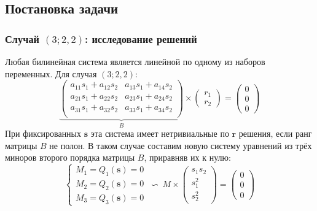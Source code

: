 \documentclass[russian,hyperref={unicode}]{beamer}
\begin{document}
\subsection{Постановка задачи}
\frame
{
	\frametitle{Случай $(3; 2, 2)$: исследование решений}
	Любая билинейная система является линейной по одному из наборов переменных. Для 
	случая $(3;2, 2)$:
	$$
		\underbrace{
		\begin{pmatrix}
			a_{1 1} s_1 + a_{1 2} s_2 & a_{1 3} s_1 + a_{1 4} s_2 \\
			a_{2 1} s_1 + a_{2 2} s_2 & a_{2 3} s_1 + a_{2 4} s_2 \\
			a_{3 1} s_1 + a_{3 2} s_2 & a_{3 3} s_1 + a_{3 4} s_2 \\
		\end{pmatrix}}_{B}
		\times
		\begin{pmatrix}
			r_1 \\
			r_2
		\end{pmatrix}=
		\begin{pmatrix}
			0 \\
			0 \\
			0
		\end{pmatrix}
	$$
	При фиксированных $\mathbf{s}$ эта система имеет нетривиальные по $\mathbf{r}$ 
	решения, если ранг матрицы $B$ не полон.
	В таком случае составим новую систему уравнений из трёх миноров второго порядка 
	матрицы $B$, приравняв их к нулю:
	$$
	\begin{cases} 
		M_1 = Q_1(\mathbf{s}) = 0 \\
		M_2 = Q_2(\mathbf{s}) = 0 \\
		M_3 = Q_3(\mathbf{s}) = 0
	\end{cases}
	~\backsim~	
	M \times 
	\begin{pmatrix}
	s_1 s_2 \\
	s_1 ^ 2 \\
	s_2 ^ 2
	\end{pmatrix}
	= 
	\begin{pmatrix}
	0 \\
	0 \\
	0
	\end{pmatrix}
	$$
}
\end{document}
